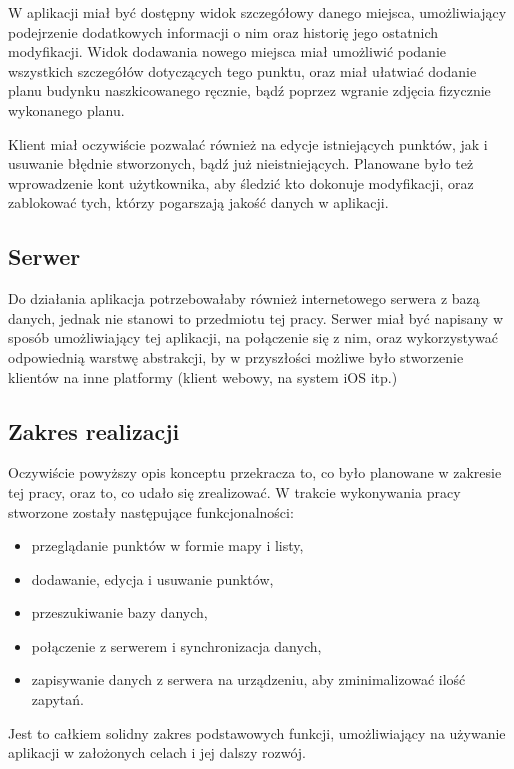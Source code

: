 \documentclass[polish,polish,a4paper,12pt]{article}
\begin{document}
	W aplikacji miał być dostępny widok szczegółowy danego miejsca, umożliwiający podejrzenie dodatkowych informacji o nim oraz historię jego ostatnich modyfikacji. Widok dodawania nowego miejsca miał umożliwić podanie wszystkich szczegółów dotyczących tego punktu, oraz miał ułatwiać dodanie planu budynku naszkicowanego ręcznie, bądź poprzez wgranie zdjęcia fizycznie wykonanego planu.

	Klient miał oczywiście pozwalać również na edycje istniejących punktów, jak i usuwanie błędnie stworzonych, bądź już nieistniejących. Planowane było też wprowadzenie kont użytkownika, aby śledzić kto dokonuje modyfikacji, oraz zablokować tych, którzy pogarszają jakość danych w aplikacji.

	\subsection{Serwer}

	Do działania aplikacja potrzebowałaby również internetowego serwera z bazą danych, jednak nie stanowi to przedmiotu tej pracy. Serwer miał być napisany w sposób umożliwiający tej aplikacji, na połączenie się z nim, oraz wykorzystywać odpowiednią warstwę abstrakcji, by w przyszłości możliwe było stworzenie klientów na inne platformy (klient webowy, na system iOS itp.)

	\subsection{Zakres realizacji}

	Oczywiście powyższy opis konceptu przekracza to, co było planowane w zakresie tej pracy, oraz to, co udało się zrealizować. W trakcie wykonywania pracy stworzone zostały następujące funkcjonalności:

	\begin{itemize}
		\item przeglądanie punktów w formie mapy i listy,
		\item dodawanie, edycja i usuwanie punktów,
		\item przeszukiwanie bazy danych,
		\item połączenie z serwerem i synchronizacja danych,
		\item zapisywanie danych z serwera na urządzeniu, aby zminimalizować ilość zapytań.
	\end{itemize}

	Jest to całkiem solidny zakres podstawowych funkcji, umożliwiający na używanie aplikacji w założonych celach i jej dalszy rozwój.
\end{document}
